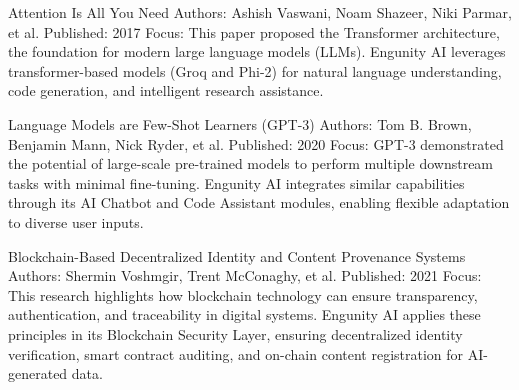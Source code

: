 Attention Is All You Need
Authors: Ashish Vaswani, Noam Shazeer, Niki Parmar, et al.
Published: 2017
Focus: This paper proposed the Transformer architecture, the foundation for modern large language models (LLMs). Engunity AI leverages transformer-based models (Groq and Phi-2) for natural language understanding, code generation, and intelligent research assistance.

Language Models are Few-Shot Learners (GPT-3)
Authors: Tom B. Brown, Benjamin Mann, Nick Ryder, et al.
Published: 2020
Focus: GPT-3 demonstrated the potential of large-scale pre-trained models to perform multiple downstream tasks with minimal fine-tuning. Engunity AI integrates similar capabilities through its AI Chatbot and Code Assistant modules, enabling flexible adaptation to diverse user inputs.

Blockchain-Based Decentralized Identity and Content Provenance Systems
Authors: Shermin Voshmgir, Trent McConaghy, et al.
Published: 2021
Focus: This research highlights how blockchain technology can ensure transparency, authentication, and traceability in digital systems. Engunity AI applies these principles in its Blockchain Security Layer, ensuring decentralized identity verification, smart contract auditing, and on-chain content registration for AI-generated data.

\pagebreak